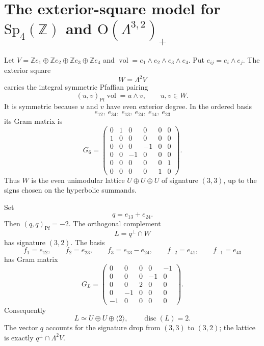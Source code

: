 \providecommand{\Sp}{\mathrm{Sp}}
\providecommand{\SL}{\mathrm{SL}}
\providecommand{\GL}{\mathrm{GL}}
\providecommand{\OO}{\mathrm{O}}
\providecommand{\SO}{\mathrm{SO}}
\providecommand{\Spin}{\mathrm{Spin}}
\providecommand{\Mp}{\mathrm{Mp}}
\providecommand{\Hb}{\mathbb{H}}
\providecommand{\Z}{\mathbb{Z}}
\providecommand{\Q}{\mathbb{Q}}
\providecommand{\R}{\mathbb{R}}
\providecommand{\C}{\mathbb{C}}
\providecommand{\Pf}{\mathrm{Pf}}
\providecommand{\wt}{\operatorname{wt}}
\providecommand{\disc}{\operatorname{disc}}
\providecommand{\vol}{\operatorname{vol}}
\providecommand{\cO}{\mathcal{O}}

\section*{The exterior-square model for \texorpdfstring{$\Sp_4(\Z)$}{Sp4(Z)}
and \texorpdfstring{$\OO(\Lambda^{3,2})_+$}{O(Lambda32)+}}
\label{sec:sp4-orthogonal-kazhdan}

Let \(V=\Z e_1\oplus\Z e_2\oplus\Z e_3\oplus\Z e_4\) and
\(\vol=e_1\wedge e_2\wedge e_3\wedge e_4\).  Put
\(e_{ij}=e_i\wedge e_j\).  The exterior square
\[
  W=\Lambda^2 V
\]
carries the integral symmetric Pfaffian pairing
\[
  (u,v)_{\Pf}\vol=u\wedge v,\qquad u,v\in W.
\]
It is symmetric because \(u\) and \(v\) have even exterior degree.  In
the ordered basis
\[
  e_{12},\ e_{34},\ e_{13},\ e_{24},\ e_{14},\ e_{23}
\]
its Gram matrix is
\[
G_6=
\begin{pmatrix}
0&1&0&0&0&0\\
1&0&0&0&0&0\\
0&0&0&-1&0&0\\
0&0&-1&0&0&0\\
0&0&0&0&0&1\\
0&0&0&0&1&0
\end{pmatrix}.
\]
Thus \(W\) is the even unimodular lattice \(U\oplus U\oplus U\) of
signature \((3,3)\), up to the signs chosen on the hyperbolic summands.

Set
\[
  q=e_{13}+e_{24}.
\]
Then \((q,q)_{\Pf}=-2\).  The orthogonal complement
\[
  L=q^\perp\cap W
\]
has signature \((3,2)\).  The basis
\[
  f_1=e_{12},\qquad
  f_2=e_{23},\qquad
  f_3=e_{13}-e_{24},\qquad
  f_{-2}=e_{41},\qquad
  f_{-1}=e_{43}
\]
has Gram matrix
\[
G_L=
\begin{pmatrix}
0&0&0&0&-1\\
0&0&0&-1&0\\
0&0&2&0&0\\
0&-1&0&0&0\\
-1&0&0&0&0
\end{pmatrix}.
\]
Consequently
\[
  L\simeq U\oplus U\oplus \langle 2\rangle,\qquad
  \disc(L)=2.
\]
The vector \(q\) accounts for the signature drop from \((3,3)\) to
\((3,2)\); the lattice is exactly \(q^\perp\cap\Lambda^2V\).

